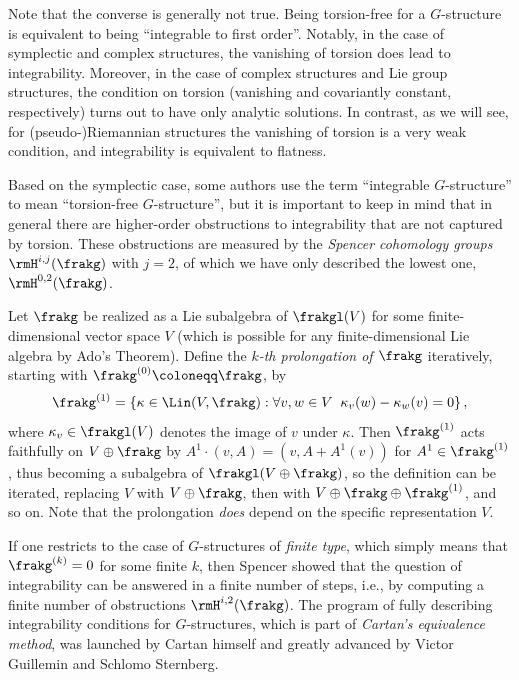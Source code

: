 \begin{rem}
    Note that the converse is generally not true. Being torsion-free for a $G$-structure is equivalent to being ``integrable to first order''. Notably, in the case of symplectic and complex structures, the vanishing of torsion does lead to integrability. Moreover, in the case of complex structures and Lie group structures, the condition on torsion (vanishing and covariantly constant, respectively) turns out to have only analytic solutions. In contrast, as we will see, for (pseudo-)Riemannian structures the vanishing of torsion is a very weak condition, and integrability is equivalent to flatness. 
    
    Based on the symplectic case, some authors use the term ``integrable $G$-structure'' to mean ``torsion-free $G$-structure'', but it is important to keep in mind that in general there are higher-order obstructions to integrability that are not captured by torsion. These obstructions are measured by the \emph{Spencer cohomology groups} $\rmH^{i,j}(\frakg)$ with $j=2$, of which we have only described the lowest one, $\rmH^{0,2}(\frakg)$. 

    Let $\frakg$ be realized as a Lie subalgebra of $\frakgl(V)$ for some finite-dimensional vector space $V$ (which is possible for any finite-dimensional Lie algebra by Ado's Theorem). Define the \emph{$k$-th prolongation of $\frakg$} iteratively, starting with $\frakg^{(0)}\coloneqq \frakg$, by
    \[\frakg^{(1)}=\left\{\kappa \in\Lin(V,\frakg):\forall v,w\in V\;\; \kappa_v(w)-\kappa_w(v)=0\right\},\]
    where $\kappa_v\in\frakgl(V)$ denotes the image of $v$ under $\kappa$. Then $\frakg^{(1)}$ acts faithfully on $V\oplus\frakg$ by $A^1\cdot (v,A)=(v,A+A^1(v))$ for $A^1\in\frakg^{(1)}$, thus becoming a subalgebra of $\frakgl(V\oplus\frakg)$, so the definition can be iterated, replacing $V$ with $V\oplus\frakg$, then with $V\oplus\frakg\oplus\frakg^{(1)}$, and so on. Note that the prolongation \emph{does} depend on the specific representation $V$. 
    
    If one restricts to the case of $G$-structures of \emph{finite type}, which simply means that $\frakg^{(k)}=0$ for some finite $k$, then Spencer showed that the question of integrability can be answered in a finite number of steps, i.e., by computing a finite number of obstructions $\rmH^{i,2}(\frakg)$. The program of fully describing integrability conditions for $G$-structures, which is part of \emph{Cartan's equivalence method}, was launched by Cartan himself and greatly advanced by Victor Guillemin and Schlomo Sternberg.
\end{rem}

